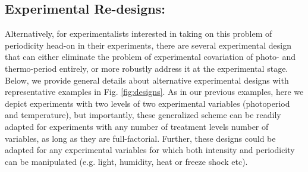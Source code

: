 \documentclass[11pt]{article}
\begin{document}
\subsection*{Experimental Re-designs:}
Alternatively, for experimentalists interested in taking on this problem of periodicity head-on in their experiments, there are several experimental design that can either eliminate the problem of experimental covariation of photo- and thermo-period entirely, or more robustly address it at the experimental stage. Below, we provide general details about alternative experimental designs with representative examples in Fig. \ref{fig:designs}. As in our previous examples, here we depict experiments with two levels of two experimental variables (photoperiod and temperature), but importantly, these generalized scheme can be readily adapted for experiments with any number of treatment levels number of variables, as long as they are full-factorial. Further, these designs could be adapted for any experimental variables for which both intensity and periodicity can be manipulated (e.g. light, humidity, heat or freeze shock etc).
\end{document}
